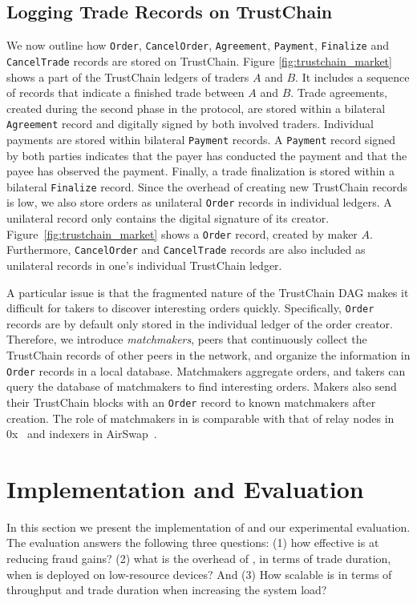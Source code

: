 \subsection{Logging Trade Records on TrustChain}
We now outline how \texttt{Order}, \texttt{CancelOrder}, \texttt{Agreement}, \texttt{Payment}, \texttt{Finalize} and \texttt{CancelTrade} records are stored on TrustChain.
Figure \ref{fig:trustchain_market} shows a part of the TrustChain ledgers of traders $ A $ and $ B $.
It includes a sequence of records that indicate a finished trade between $ A $ and $ B $.
Trade agreements, created during the second phase in the \ModelName{} protocol, are stored within a bilateral \texttt{Agreement} record and digitally signed by both involved traders.
Individual payments are stored within bilateral \texttt{Payment} records.
A \texttt{Payment} record signed by both parties indicates that the payer has conducted the payment and that the payee has observed the payment.
Finally, a trade finalization is stored within a bilateral \texttt{Finalize} record.
Since the overhead of creating new TrustChain records is low, we also store orders as unilateral \texttt{Order} records in individual ledgers.
A unilateral record only contains the digital signature of its creator.
Figure~\ref{fig:trustchain_market} shows a \texttt{Order} record, created by maker $ A $.
Furthermore, \texttt{CancelOrder} and \texttt{CancelTrade} records are also included as unilateral records in one's individual TrustChain ledger.

A particular issue is that the fragmented nature of the TrustChain DAG makes it difficult for takers to discover interesting orders quickly.
Specifically, \texttt{Order} records are by default only stored in the individual ledger of the order creator.
Therefore, we introduce \emph{matchmakers}, peers that continuously collect the TrustChain records of other peers in the network, and organize the information in \texttt{Order} records in a local database.
Matchmakers aggregate orders, and takers can query the database of matchmakers to find interesting orders.
Makers also send their TrustChain blocks with an \texttt{Order} record to known matchmakers after creation.
The role of matchmakers in \ModelName{} is comparable with that of relay nodes in 0x~\cite{warren20170x} and indexers in AirSwap~\cite{airswap}.

\section{Implementation and Evaluation}
\label{sec:evaluation}
In this section we present the implementation of \ModelName{} and our experimental evaluation.
The evaluation answers the following three questions: (1) how effective is \ModelName{} at reducing fraud gains? (2) what is the overhead of \ModelName{}, in terms of trade duration, when \ModelName{} is deployed on low-resource devices? And (3) How scalable is \ModelName{} in terms of throughput and trade duration when increasing the system load?

